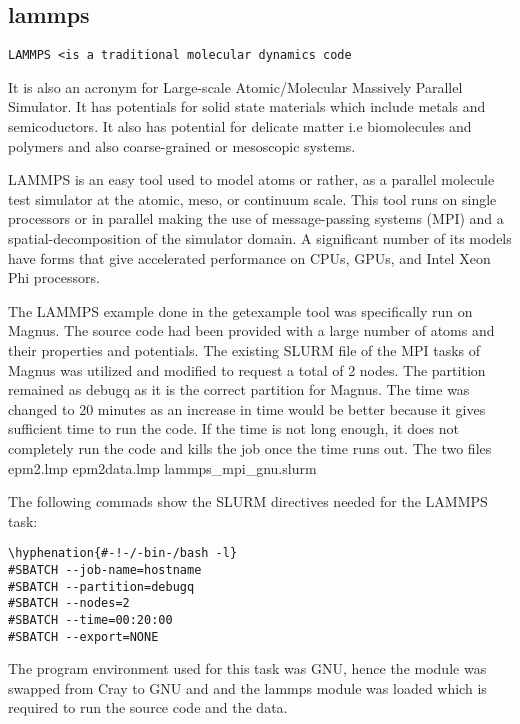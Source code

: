 \subsection{lammps}

\begin{Verbatim}[fontsize=\stripsize]
LAMMPS <is a traditional molecular dynamics code
\end{Verbatim} 

It is also an acronym for Large-scale Atomic/Molecular Massively Parallel Simulator. It has potentials
for solid state materials which include metals and semicoductors. It also has potential for delicate matter i.e biomolecules and polymers and also
coarse-grained or mesoscopic systems.

LAMMPS is an easy tool used to model atoms or rather, as a parallel molecule test simulator at the atomic, meso, or continuum scale. This tool runs on
single processors or in parallel making the use of message-passing systems (MPI) and a spatial-decomposition of the simulator domain. A significant
number of its models have forms that give accelerated performance on CPUs, GPUs, and Intel Xeon Phi processors.

The LAMMPS example done in the getexample tool was specifically run on Magnus. The source code had been provided with a large number of atoms and their
properties and potentials. The existing SLURM file of the MPI tasks of Magnus was utilized and modified to request a total of 2 nodes. The partition
remained as debugq as it is the correct partition for Magnus. The time was changed to 20 minutes as an increase in time would be better because it gives
sufficient time to run the code. If the time is not long enough, it does not completely run the code and kills the job once the time runs out.
The two files epm2.lmp  epm2data.lmp  lammps_mpi_gnu.slurm

The following commads show the SLURM directives needed for the LAMMPS task:

\begin{tcolorbox}
\begin{verbatim}
\hyphenation{#-!-/-bin-/bash -l}
#SBATCH --job-name=hostname
#SBATCH --partition=debugq
#SBATCH --nodes=2
#SBATCH --time=00:20:00
#SBATCH --export=NONE
\end{verbatim}
\end{tcolorbox}

The program environment used for this task was GNU, hence the module was swapped from Cray to GNU and and the lammps module was loaded which is required
to run the source code and the data.

